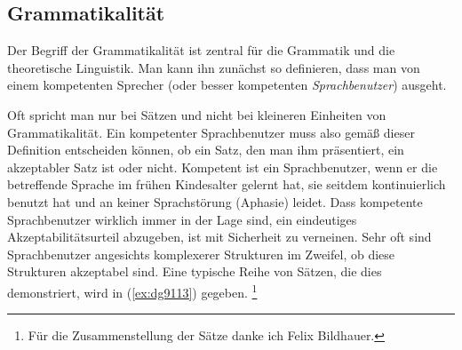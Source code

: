 \subsection{Grammatikalität}

\label{sec:grammungramm}
\label{sec:grammatikalitaet}


Der Begriff der Grammatikalität ist zentral für die Grammatik und die theoretische Linguistik.
Man kann ihn zunächst so definieren, dass man von einem kompetenten Sprecher (oder besser kompetenten \textit{Sprachbenutzer}) ausgeht.


\enlargethispage{1\baselineskip}
Oft spricht man nur bei Sätzen und nicht bei kleineren Einheiten von Grammatikalität.
Ein kompetenter Sprachbenutzer muss also gemäß dieser Definition entscheiden können, ob ein Satz, den man ihm präsentiert, ein akzeptabler Satz ist oder nicht.
Kompetent ist ein Sprachbenutzer, wenn er die betreffende Sprache im frühen Kindesalter gelernt hat, sie seitdem kontinuierlich benutzt hat und an keiner Sprachstörung (Aphasie) leidet.
Dass kompetente Sprachbenutzer wirklich immer in der Lage sind, ein eindeutiges Akzeptabilitätsurteil abzugeben, ist mit Sicherheit zu verneinen.
Sehr oft sind Sprachbenutzer angesichts komplexerer Strukturen im Zweifel, ob diese Strukturen akzeptabel sind.
Eine typische Reihe von Sätzen, die dies demonstriert, wird in (\ref{ex:dg9113}) gegeben.%
\footnote{Für die Zusammenstellung der Sätze danke ich Felix Bildhauer.}

\begin{exe}
  \ex\label{ex:dg9113}
  \begin{xlist}
  \end{xlist}
\end{exe}

